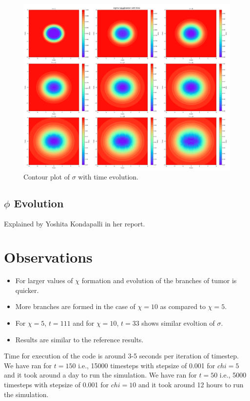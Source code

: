 \documentclass[12pt]{article}
\begin{document}
\begin{figure}
    \centering
    \includegraphics[width=1.0\textwidth]{../sigmaVsT_contour_chi10.png}
    \caption{Contour plot of $\sigma$ with time evolution.}
    \label{fig:sigmaVsT_contour_chi10}
\end{figure}

\subsection*{$\phi$ Evolution}
Explained by Yoshita Kondapalli in her report.

\section*{Observations}
\begin{itemize}
    \item For larger values of $\chi$ formation and evolution of the branches of tumor is quicker.
    \item More branches are formed in the case of $\chi=10$ as compared to $\chi=5$.
    \item For $\chi=5$, $t=111$ and for $\chi=10$, $t=33$ shows similar evoltion of $\sigma$.
    \item Results are similar to the reference results.
\end{itemize}
Time for execution of the code is around 3-5 seconds per iteration of timestep.
We have ran for $t=150$ i.e., 15000 timesteps with stepsize of 0.001 for $chi=5$ and it took around a day to run the simulation.
We have ran for $t=50$ i.e., 5000 timesteps with stepsize of 0.001 for $chi=10$ and it took around 12 hours to run the simulation.
\end{document}
